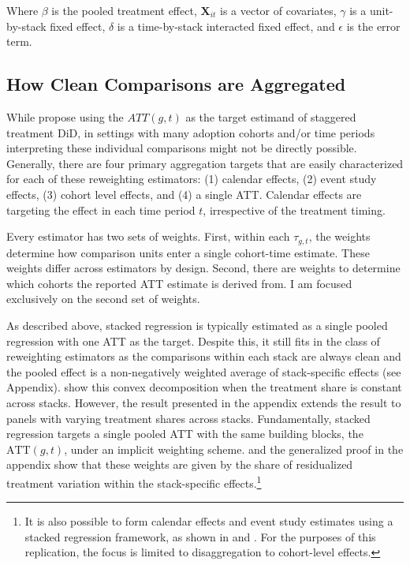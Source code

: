 \documentclass[12pt]{article}
\begin{document}
Where $\beta$ is the pooled treatment effect, $\mathbf{X}_{it}$ is a vector of covariates, $\gamma$ is a unit-by-stack fixed effect, $\delta$ is a time-by-stack interacted fixed effect, and $\epsilon$ is the error term.

\subsection{How Clean Comparisons are Aggregated}\label{sec:aggregation}

While \textcite{callaway2021difference} propose using the $ATT(g,t)$ as the target estimand of staggered treatment DiD, in settings with many adoption cohorts and/or time periods interpreting these individual comparisons might not be directly possible. Generally, there are four primary aggregation targets that are easily characterized for each of these reweighting estimators: (1) calendar effects, (2) event study effects, (3) cohort level effects, and (4) a single ATT. Calendar effects are targeting the effect in each time period $t$, irrespective of the treatment timing. 

Every estimator has two sets of weights. First, within each $\tau_{g,t}$, the weights determine how comparison units enter a single cohort-time estimate. These weights differ across estimators by design. Second, there are weights to determine which cohorts the reported ATT estimate is derived from. I am focused exclusively on the second set of weights.

As described above, stacked regression is typically estimated as a single pooled regression with one ATT as the target. Despite this, it still fits in the class of reweighting estimators as the comparisons within each stack are always clean and the pooled effect is a non-negatively weighted average of stack-specific effects (see Appendix). \textcite{wing2024stacked} show this convex decomposition when the treatment share is constant across stacks. However, the result presented in the appendix extends the result to panels with varying treatment shares across stacks. Fundamentally, stacked regression targets a single pooled ATT with the same building blocks, the $\text{ATT}(g,t)$, under an implicit weighting scheme. \textcite{wing2024stacked} and the generalized proof in the appendix show that these weights are given by the share of residualized treatment variation within the stack-specific effects.\footnote{It is also possible to form calendar effects and event study estimates using a stacked regression framework, as shown in \textcite{cengiz2019effect} and \textcite{wing2024stacked}. For the purposes of this replication, the focus is limited to disaggregation to cohort-level effects.}
\end{document}
